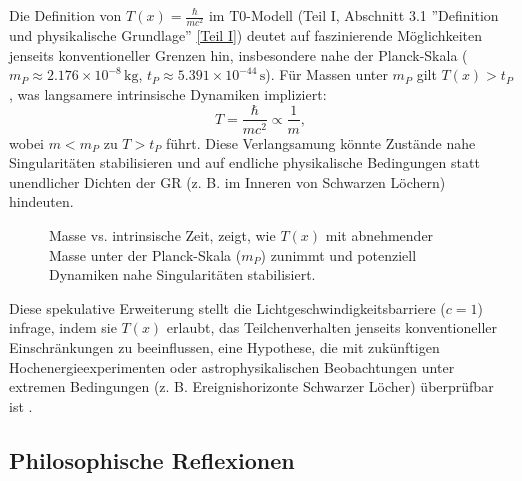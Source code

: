 \documentclass[12pt,a4paper]{article}
\newcommand{\Tfield}{T(x)}
\begin{document}
	Die Definition von \(\Tfield = \frac{\hbar}{m c^2}\) im T0-Modell (Teil I, Abschnitt 3.1 ''Definition und physikalische Grundlage'' \href{https://github.com/jpascher/T0-Time-Mass-Duality/tree/main/2/pdf/Deutsch/QMRelTimeMassPart1.pdf}{[Teil I]}) deutet auf faszinierende Möglichkeiten jenseits konventioneller Grenzen hin, insbesondere nahe der Planck-Skala (\(m_P \approx 2.176 \times 10^{-8} \, \text{kg}\), \(t_P \approx 5.391 \times 10^{-44} \, \text{s}\)). Für Massen unter \(m_P\) gilt \(\Tfield > t_P\), was langsamere intrinsische Dynamiken impliziert:
	\begin{equation}
		T = \frac{\hbar}{m c^2} \propto \frac{1}{m},
		\label{eq:intrinsic_time_repeat}
	\end{equation}
	wobei \(m < m_P\) zu \(T > t_P\) führt. Diese Verlangsamung könnte Zustände nahe Singularitäten stabilisieren und auf endliche physikalische Bedingungen statt unendlicher Dichten der GR (z. B. im Inneren von Schwarzen Löchern) hindeuten.
	
	\begin{figure}[h]
		\centering
		\caption{Masse vs. intrinsische Zeit, zeigt, wie \(\Tfield\) mit abnehmender Masse unter der Planck-Skala (\(m_P\)) zunimmt und potenziell Dynamiken nahe Singularitäten stabilisiert.}
		\label{fig:mass_time}
	\end{figure}
	
	Diese spekulative Erweiterung stellt die Lichtgeschwindigkeitsbarriere (\(c = 1\)) infrage, indem sie \(\Tfield\) erlaubt, das Teilchenverhalten jenseits konventioneller Einschränkungen zu beeinflussen, eine Hypothese, die mit zukünftigen Hochenergieexperimenten oder astrophysikalischen Beobachtungen unter extremen Bedingungen (z. B. Ereignishorizonte Schwarzer Löcher) überprüfbar ist \cite{pascher_planck_2025}.
	
	\subsection{Philosophische Reflexionen}
	\label{subsec:philosophical_reflections}
	
\end{document}
